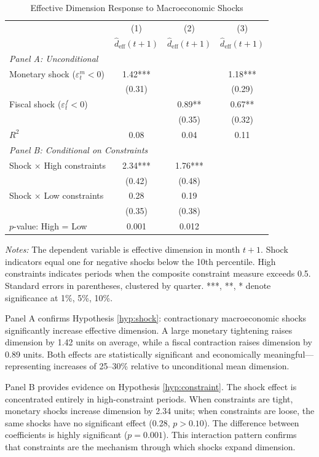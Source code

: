 \documentclass[12pt,letterpaper]{article}
\theoremstyle{plain}
\theoremstyle{definition}
\begin{document}
\begin{table}[htbp]
\centering
\caption{Effective Dimension Response to Macroeconomic Shocks}
\label{tab:dimension_shocks}
\begin{tabular}{lccc}
\toprule
& (1) & (2) & (3) \\
& $\hat{d}_{\text{eff}}(t+1)$ & $\hat{d}_{\text{eff}}(t+1)$ & $\hat{d}_{\text{eff}}(t+1)$ \\
\midrule
\multicolumn{4}{l}{\textit{Panel A: Unconditional}} \\[0.5em]
Monetary shock ($\varepsilon_t^m < 0$) & 1.42*** & & 1.18*** \\
& (0.31) & & (0.29) \\[0.3em]
Fiscal shock ($\varepsilon_t^f < 0$) & & 0.89** & 0.67** \\
& & (0.35) & (0.32) \\[0.5em]
$R^2$ & 0.08 & 0.04 & 0.11 \\
\midrule
\multicolumn{4}{l}{\textit{Panel B: Conditional on Constraints}} \\[0.5em]
Shock $\times$ High constraints & 2.34*** & 1.76*** & \\
& (0.42) & (0.48) & \\[0.3em]
Shock $\times$ Low constraints & 0.28 & 0.19 & \\
& (0.35) & (0.38) & \\[0.5em]
$p$-value: High = Low & 0.001 & 0.012 & \\
\bottomrule
\end{tabular}

\vspace{0.5em}
\footnotesize
\textit{Notes:} The dependent variable is effective dimension in month $t+1$. Shock indicators equal one for negative shocks below the 10th percentile. High constraints indicates periods when the composite constraint measure exceeds 0.5. Standard errors in parentheses, clustered by quarter. ***, **, * denote significance at 1\%, 5\%, 10\%.
\end{table}

Panel A confirms Hypothesis \ref{hyp:shock}: contractionary macroeconomic shocks significantly increase effective dimension. A large monetary tightening raises dimension by 1.42 units on average, while a fiscal contraction raises dimension by 0.89 units. Both effects are statistically significant and economically meaningful---representing increases of 25--30\% relative to unconditional mean dimension.

Panel B provides evidence on Hypothesis \ref{hyp:constraint}. The shock effect is concentrated entirely in high-constraint periods. When constraints are tight, monetary shocks increase dimension by 2.34 units; when constraints are loose, the same shocks have no significant effect (0.28, $p > 0.10$). The difference between coefficients is highly significant ($p = 0.001$). This interaction pattern confirms that constraints are the mechanism through which shocks expand dimension.
\end{document}
